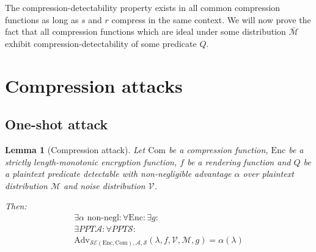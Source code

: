 \documentclass[conference, letterpaper, 10pt]{IEEEtran}
\newtheorem{lemma}{Lemma}
\begin{document}
The compression-detectability property exists in all common compression
functions as long as $s$ and $r$ compress in the same context. We will now
prove the fact that all compression functions which are ideal under some
distribution $\bar{\mathcal{M}}$ exhibit compression-detectability of some
predicate $Q$.

\section{Compression attacks}\label{sec:comattack}

\subsection{One-shot attack}

\begin{lemma}[Compression attack]

Let $\textrm{Com}$ be a compression function, $\textrm{Enc}$ be a strictly length-monotonic
encryption function, $f$ be a rendering function and $Q$ be a plaintext
predicate detectable with non-negligible advantage $\alpha$ over plaintext
distribution $\mathcal{M}$ and noise distribution $\mathcal{V}$.

Then:
\begin{align*}
    \exists \alpha \text{ non-negl}:
    \forall \textrm{Enc}:
    \exists g:\\
    \exists PPT \mathcal{A}:
    \forall PPT \mathcal{S}:\\
    \text{Adv}_{\mathcal{SE}(\textrm{Enc}, \textrm{Com}), \mathcal{A}, \mathcal{S}}
    (\lambda, f, \mathcal{V}, \mathcal{M}, g) = \alpha(\lambda)
\end{align*}

\end{lemma}
\end{document}
